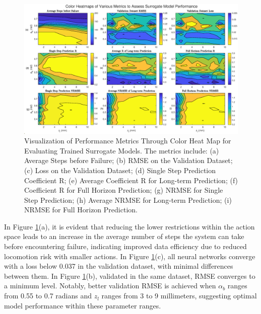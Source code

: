 \begin{figure}[htb]
    \centering
    \includegraphics[width=\linewidth]{img/chap5/NN_heat.eps}
    \caption{Visualization of Performance Metrics Through Color Heat Map for Evaluating Trained Surrogate Models. The metrics include: (a) Average Steps before Failure; (b) \ac{RMSE} on the Validation Dataset; (c) Loss on the Validation Dataset; (d) Single Step Prediction Coefficient R; (e) Average Coefficient R for Long-term Prediction; (f) Coefficient R for Full Horizon Prediction; (g) NRMSE for Single Step Prediction; (h) Average NRMSE for Long-term Prediction; (i) NRMSE for Full Horizon Prediction.}
    \label{fig:NN_heat}
\end{figure}

In Figure \ref{fig:NN_heat}(a), it is evident that reducing the lower restrictions within the action space leads to an increase in the average number of steps the system can take before encountering failure, indicating improved data efficiency due to reduced locomotion risk with smaller actions. In Figure \ref{fig:NN_heat}(c), all neural networks converge with a loss below 0.037 in the validation dataset, with minimal differences between them. In Figure \ref{fig:NN_heat}(b), validated in the same dataset, RMSE converges to a minimum level. Notably, better validation RMSE is achieved when $\alpha_b$ ranges from 0.55 to 0.7 radians and $z_l$ ranges from 3 to 9 millimeters, suggesting optimal model performance within these parameter ranges.

